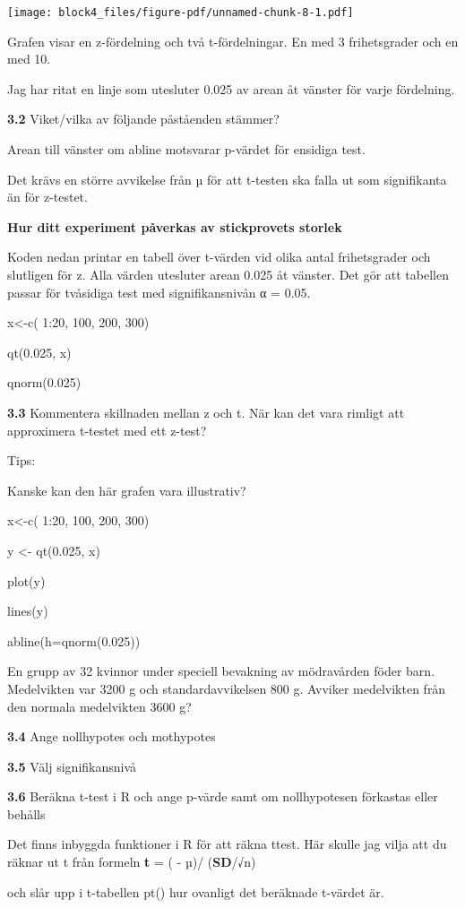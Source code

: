 \documentclass[
  letterpaper,
  DIV=11,
  numbers=noendperiod]{scrartcl}
\begin{document}
\texttt{[image: block4\_files/figure-pdf/unnamed-chunk-8-1.pdf]}

Grafen visar en z-fördelning och två t-fördelningar. En med 3
frihetsgrader och en med 10.

Jag har ritat en linje som utesluter 0.025 av arean åt vänster för varje
fördelning.

\textbf{3.2} Viket/vilka av följande påståenden stämmer?

Arean till vänster om abline motsvarar p-värdet för ensidiga test.

Det krävs en större avvikelse från µ för att t-testen ska falla ut som
signifikanta än för z-testet.

\textbf{Hur ditt experiment påverkas av stickprovets storlek}

Koden nedan printar en tabell över t-värden vid olika antal
frihetsgrader och slutligen för z. Alla värden utesluter arean 0.025 åt
vänster. Det gör att tabellen passar för tvåsidiga test med
signifikansnivån α = 0.05.

x\textless-c( 1:20, 100, 200, 300)

qt(0.025, x)

qnorm(0.025)

\textbf{3.3} Kommentera skillnaden mellan z och t. När kan det vara
rimligt att approximera t-testet med ett z-test?

Tips:

Kanske kan den här grafen vara illustrativ?

x\textless-c( 1:20, 100, 200, 300)

y \textless- qt(0.025, x)

plot(y)

lines(y)

abline(h=qnorm(0.025))

En grupp av 32 kvinnor under speciell bevakning av mödravården föder
barn. Medelvikten var 3200 g och standardavvikelsen 800 g. Avviker
medelvikten från den normala medelvikten 3600 g?

\textbf{3.4} Ange nollhypotes och mothypotes

\textbf{3.5} Välj signifikansnivå

\textbf{3.6} Beräkna t-test i R och ange p-värde samt om nollhypotesen
förkastas eller behålls

Det finns inbyggda funktioner i R för att räkna ttest. Här skulle jag
vilja att du räknar ut t från formeln \textbf{t} = ( - µ)/
(\textbf{SD}/√n)

och slår upp i t-tabellen pt() hur ovanligt det beräknade t-värdet är.
\end{document}
